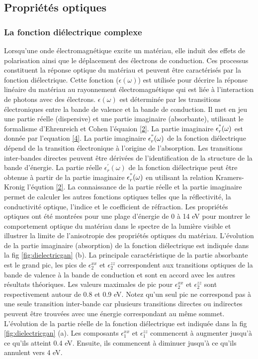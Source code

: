 \subsection{Propriétés optiques}

\subsubsection{La fonction diélectrique complexe}

Lorsqu'une onde électromagnétique excite un matériau, elle induit des effets de polarisation ainsi que le déplacement des électrons de conduction. Ces processus constituent la réponse optique du matériau et peuvent être caractérisés par la fonction diélectrique. Cette fonction ($ \epsilon(\omega) $) est utilisée pour décrire la réponse linéaire du matériau au rayonnement électromagnétique qui est liée à l'interaction de photons avec des électrons. $ \epsilon(\omega) $ est déterminée par les transitions électroniques entre la bande de valence et la bande de conduction. Il met en jeu une partie réelle (dispersive) et une partie imaginaire (absorbante), utilisant le formalisme d'Ehrenreich et Cohen l'équaion \eqref{2}. La partie imaginaire $ \epsilon_{r}^{"}(\omega) $ est donnée par l'equation \eqref{4}. La partie imaginaire $ \epsilon_{r}^{"}(\omega) $ de la fonction diélectrique dépend de la transition électronique à l'origine de l'absorption. Les transitions inter-bandes directes peuvent être dérivées de l'identification de la structure de la bande d'énergie. La partie réelle $ \epsilon_{r}^{'}(\omega) $ de la fonction diélectrique peut être obtenue à partir de la partie imaginaire $ \epsilon_{r}^{"}(\omega) $ en utilisant la relation Kramers-Kronig l'éqution \eqref{2}. La connaissance de la partie réelle et la partie imaginaire permet de calculer les autres fonctions optiques telles que la réflectivité, la conductivité optique, l'indice et le coefficient de réfraction. Les propriétés optiques ont été montrées pour une plage d'énergie de 0 à 14 eV pour montrer le comportement optique du matériau dans le spectre de la lumière visible et illustrer la limite de l'anisotropie des propriétés optiques du matériau. L'évolution de la partie imaginaire (absorption) de la fonction diélectrique est indiquée dans la fig \ref{fig:dielectricgan} (b).  
La principale caractéristique de la partie absorbante est le grand pic, les pics de $ \epsilon_{2}^{xx}$ et $ \epsilon_{2}^{zz}$ correspondent aux transitions optiques de la bande de valence à la bande de conduction et sont en accord avec les autres résultats théoriques. Les valeurs maximales de pic pour $ \epsilon_{2}^{xx}$ et $ \epsilon_{2}^{zz}$ sont respectivement autour de 0.8 et 0.9 eV. Notez qu'un seul pic ne correspond pas à une seule transition inter-bande car plusieurs transitions directes ou indirectes peuvent être trouvées avec une énergie correspondant au même sommet.
L'évolution de la partie réelle de la fonction diélectrique est indiquée dans la fig \ref{fig:dielectricgan} (a). Les composants $ \epsilon_{1}^{xx}$ et $ \epsilon_{1}^{zz}$ commencent à augmenter jusqu'à ce qu'ils atteint 0.4 eV. Ensuite, ils commencent à diminuer jusqu'à ce qu'ils annulent vers 4 eV.

